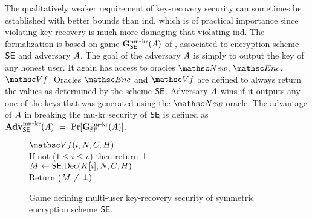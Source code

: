
The qualitatively weaker requirement of key-recovery security can sometimes be established with better bounds than ind, which is of practical importance since violating key recovery is much more damaging that violating ind. The formalization is based on game $\mathbf{G}^{\rm mu\mbox{-}kr}_{\mathsf{SE}}(A)$ of , associated to encryption scheme $\mathsf{SE}$ and adversary $A$.  The goal of the adversary $A$ is simply to output the key of any honest user. It again has access to oracles $\NewO$, $\EncO$, $\VfO$. Oracles $\EncO$ and $\VfO$ are defined to always return the values as determined by the scheme $\mathsf{SE}$. Adversary $A$ wins if it outputs any one of the keys that was generated using the $\NewO$ oracle. The advantage of $A$ in breaking the mu-kr security of $\mathsf{SE}$ is defined as $
	\mukrAdv{\se}{\advA} \ = \ \Pr[\gmuKR{\se}(\advA)]$.

\begin{figure} [t]
{
\underline{$\VfO(i,\iv,\ciph,\header)$}\\[2pt]
If not ($1\leq i\leq v$) then return $\bot$ \\
$M \gets \mathsf{SE}.\mathsf{Dec}(K[i],N,C,H)$ \\
Return ($M\neq\bot)$ \medskip
}
\vspace{-2ex}
\caption{Game defining multi-user key-recovery security of symmetric encryption scheme $\mathsf{SE}$.}
\label{fig-se-mu-kr}
\hrulefill
\end{figure}
